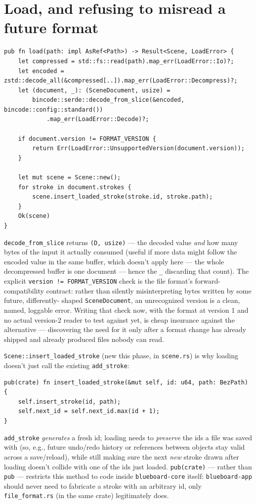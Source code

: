 \documentclass[11pt]{article}
\begin{document}
\section{Load, and refusing to misread a future format}
\begin{lstlisting}
pub fn load(path: impl AsRef<Path>) -> Result<Scene, LoadError> {
    let compressed = std::fs::read(path).map_err(LoadError::Io)?;
    let encoded = zstd::decode_all(&compressed[..]).map_err(LoadError::Decompress)?;
    let (document, _): (SceneDocument, usize) =
        bincode::serde::decode_from_slice(&encoded, bincode::config::standard())
            .map_err(LoadError::Decode)?;

    if document.version != FORMAT_VERSION {
        return Err(LoadError::UnsupportedVersion(document.version));
    }

    let mut scene = Scene::new();
    for stroke in document.strokes {
        scene.insert_loaded_stroke(stroke.id, stroke.path);
    }
    Ok(scene)
}
\end{lstlisting}
\texttt{decode\_from\_slice} returns \texttt{(D, usize)} — the decoded value \emph{and} how
many bytes of the input it actually consumed (useful if more data might follow the encoded
value in the same buffer, which doesn't apply here — the whole decompressed buffer is one
document — hence the \texttt{\_} discarding that count). The explicit
\texttt{version != FORMAT\_VERSION} check is the file format's forward-compatibility
contract: rather than silently misinterpreting bytes written by some future, differently-
shaped \texttt{SceneDocument}, an unrecognized version is a clean, named, loggable error.
Writing that check now, with the format at version 1 and no actual version-2 reader to
test against yet, is cheap insurance against the alternative — discovering the need for it
only after a format change has already shipped and already produced files nobody can read.

\texttt{Scene::insert\_loaded\_stroke} (new this phase, in \texttt{scene.rs}) is why
loading doesn't just call the existing \texttt{add\_stroke}:
\begin{lstlisting}
pub(crate) fn insert_loaded_stroke(&mut self, id: u64, path: BezPath) {
    self.insert_stroke(id, path);
    self.next_id = self.next_id.max(id + 1);
}
\end{lstlisting}
\texttt{add\_stroke} \emph{generates} a fresh id; loading needs to \emph{preserve} the ids
a file was saved with (so, e.g., future undo/redo history or references between objects
stay valid across a save/reload), while still making sure the next \emph{new} stroke drawn
after loading doesn't collide with one of the ids just loaded.
\texttt{pub(crate)} — rather than \texttt{pub} — restricts this method to code inside
\texttt{blueboard-core} itself: \texttt{blueboard-app} should never need to fabricate a
stroke with an arbitrary id, only \texttt{file\_format.rs} (in the same crate) legitimately
does.
\end{document}
